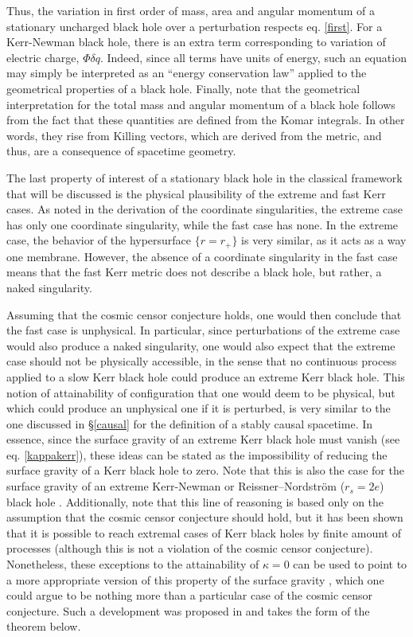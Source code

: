 \documentclass[
12pt,		%
openright,	%
twoside,  %
a4paper,			%
chapter=TITLE,		%
english,			%
french,				%
spanish,			%
brazil				%
]{USPSC-classe/USPSC}
\begin{document}
Thus, the variation in first order of mass, area and angular momentum of a stationary uncharged black hole over a perturbation respects eq. \ref{first}. For a Kerr-Newman black hole, there is an extra term corresponding to variation of electric charge, $\Phi \delta q$. Indeed, since all terms have units of energy, such an equation may simply be interpreted as an ``energy conservation law'' applied to the geometrical properties of a black hole. Finally, note that the geometrical interpretation for the total mass and angular momentum of a black hole follows from the fact that these quantities are defined from the Komar integrals. In other words, they rise from Killing vectors, which are derived from the metric, and thus, are a consequence of spacetime geometry.

The last property of interest of a stationary black hole in the classical framework that will be discussed is the physical plausibility of the extreme and fast Kerr cases. As noted in the derivation of the coordinate singularities, the extreme case has only one coordinate singularity, while the fast case has none. In the extreme case, the behavior of the hypersurface $\{r=r_+\}$ is very similar, as it acts as a way one membrane. However, the absence of a coordinate singularity in the fast case means that the fast Kerr metric does not describe a black hole, but rather, a naked singularity. 

Assuming that the cosmic censor conjecture holds, one would then conclude that the fast case is unphysical. In particular, since perturbations of the extreme case would also produce a naked singularity, one would also expect that the extreme case should not be physically accessible, in the sense that no continuous process applied to a slow Kerr black hole could produce an extreme Kerr black hole. This notion of attainability of configuration that one would deem to be physical, but which could produce an unphysical one if it is perturbed, is very similar to the one discussed in \S\;\ref{causal} for the definition of a stably causal spacetime. In essence, since the surface gravity of an extreme Kerr black hole must vanish (see eq. \ref{kappakerr}), these ideas can be stated as the impossibility of reducing the surface gravity of a Kerr black hole to zero. Note that this is also the case for the surface gravity of an extreme Kerr-Newman or Reissner–Nordström ($r_s=2e$) black hole \cite{Wald1984}. Additionally, note that this line of reasoning is based only on the assumption that the cosmic censor conjecture should hold, but it has been shown that it is possible to reach extremal cases of Kerr black holes by finite amount of processes \cite{Farrugia1979} (although this is not a violation of the cosmic censor conjecture). Nonetheless, these exceptions to the attainability of $\kappa=0$ can be used to point to a more appropriate version of this property of the surface gravity \cite{Sullivan1980}, which one could argue to be nothing more than a particular case of the cosmic censor conjecture. Such a development was proposed in \cite{Israel1986} and takes the form of the theorem below.
\end{document}
